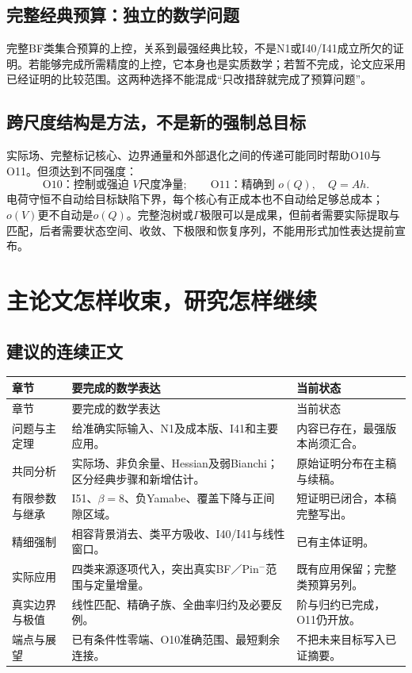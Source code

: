 \documentclass[UTF8,fontset=fandol,zihao=-4,a4paper]{ctexart}
\theoremstyle{remark}
\begin{document}
\subsection{完整经典预算：独立的数学问题}

完整BF类集合预算的上控，关系到最强经典比较，不是N1或I40/I41成立所欠的证明。若能够完成所需精度的上控，它本身也是实质数学；若暂不完成，论文应采用已经证明的比较范围。这两种选择不能混成“只改措辞就完成了预算问题”。

\subsection{跨尺度结构是方法，不是新的强制总目标}

实际场、完整标记核心、边界通量和外部退化之间的传递可能同时帮助O10与O11。但须达到不同强度：
\[
\text{O10：控制或强迫 }V\text{尺度净量};\qquad
\text{O11：精确到 }o(Q),\quad Q=Ah.
\]
电荷守恒不自动给目标缺陷下界，每个核心有正成本也不自动给足够总成本；$o(V)$更不自动是$o(Q)$。完整泡树或$\Gamma$极限可以是成果，但前者需要实际提取与匹配，后者需要状态空间、收敛、下极限和恢复序列，不能用形式加性表达提前宣布。

\section{主论文怎样收束，研究怎样继续}

\subsection{建议的连续正文}

\begin{longtable}{L{27mm}L{76mm}L{44mm}}
\toprule 章节 & 要完成的数学表达 & 当前状态 \\\midrule
\endfirsthead
\toprule 章节 & 要完成的数学表达 & 当前状态 \\\midrule
\endhead
问题与主定理 & 给准确实际输入、N1及成本版、I41和主要应用。 & 内容已存在，最强版本尚须汇合。 \\
共同分析 & 实际场、非负余量、Hessian及弱Bianchi；区分经典步骤和新增估计。 & 原始证明分布在主稿与续稿。 \\
有限参数与继承 & I51、$\beta=8$、负Yamabe、覆盖下降与正间隙区域。 & 短证明已闭合，本稿完整写出。 \\
精细强制 & 相容背景消去、类平方吸收、I40/I41与线性窗口。 & 已有主体证明。 \\
实际应用 & 四类来源逐项代入，突出真实BF／Pin$^-$范围与定量增量。 & 既有应用保留；完整类预算另列。 \\
真实边界与极值 & 线性匹配、精确子族、全曲率归约及必要反例。 & 阶与归约已完成，O11仍开放。 \\
端点与展望 & 已有条件性零端、O10准确范围、最短剩余连接。 & 不把未来目标写入已证摘要。 \\
\bottomrule
\end{longtable}
\end{document}
